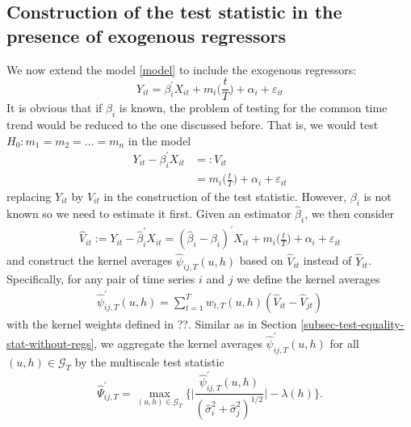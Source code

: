 \documentclass[a4paper,12pt]{article}
\begin{document}
%
%

\subsection{Construction of the test statistic in the presence of exogenous regressors}\label{subsec-test-equality-stat-with-regs}

We now extend the model \eqref{model} to include the exogenous regressors:
\begin{equation}
Y_{it} = \beta_i^\prime X_{it} + m_i \Big( \frac{t}{T} \Big) + \alpha_i + \varepsilon_{it} 
\end{equation}
It is obvious that if $\beta_i$ is known, the problem of testing for the common time trend would be reduced to the one discussed before. That is, we would test $H_0: m_1 = m_2 = \ldots = m_n$ in the model
\begin{align*}
Y_{it} - \beta_i^\prime X_{it} & =: V_{it}\\
					& = m_i \Big( \frac{t}{T} \Big) + \alpha_i + \varepsilon_{it} 
\end{align*}
replacing $Y_{it}$ by $V_{it}$ in the construction of the test statistic. However, $\beta_i$ is not known so we need to estimate it first. Given an estimator $\widehat{\beta}_i$, we then consider
\begin{align*}
	\widehat{V}_{it} := Y_{it} - \widehat{\beta}_i^\prime X_{it} =(\widehat{\beta}_i - \beta_i)^\prime X_{it} + m_i \Big( \frac{t}{T} \Big) + \alpha_i + \varepsilon_{it} 
\end{align*}
and construct the kernel averages $\widehat{\psi}_{ij, T}(u, h)$ based on $\widehat{V}_{it}$ instead of $\widehat{Y}_{it}$. Specifically, for any pair of time series $i$ and $j$ we define the kernel averages
\begin{align*}
	\widehat{\psi}^{\prime}_{ij, T}(u, h) = \sum_{t=1}^T w_{t, T}(u, h)(\widehat{V}_{it} - \widehat{V}_{jt})
\end{align*}
with the kernel weights defined in ??. Similar as in Section \ref{subsec-test-equality-stat-without-regs}, we aggregate the kernel averages $\widehat{\psi}^{\prime}_{ij, T}(u, h)$ for all $(u, h)\in \mathcal{G}_T$ by the multiscale test statistic
\[ \widehat{\Psi}^\prime_{ij,T} = \max_{(u,h) \in \mathcal{G}_T} \Big\{ \Big|\frac{\widehat{\psi}^\prime_{ij,T}(u,h)}{(\widehat{\sigma}_i^2 + \widehat{\sigma}_j^2)^{1/2}}\Big| - \lambda(h) \Big\}. \]
\end{document}
